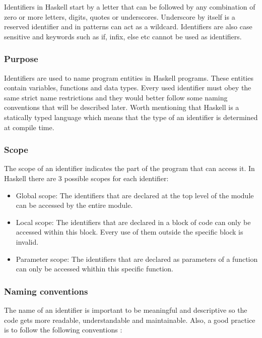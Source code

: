 \documentclass[a4paper, titlepage, twoside]{article}
\begin{document}
Identifiers in Haskell start by a letter that can be followed by any combination of zero or more letters, digits, quotes or underscores.  Underscore by itself is a reserved identifier and in patterns can act as a wildcard. Identifiers are also case sensitive and keywords such as if, infix, else etc cannot be used as identifiers.

\subsubsection{Purpose}
\label{sec:org1d34997}

Identifiers are used to name program entities in Haskell programs. These entities contain variables, functions and data types. Every used identifier must obey the same strict name restrictions and they would better follow some naming conventions that will be described later.  Worth mentioning that Haskell is a statically typed language which means that the type of an identifier is determined at compile time.

\subsubsection{Scope}
\label{sec:org1c0b7af}

The scope of an identifier indicates the part of the program that can access it. In Haskell there are 3 possible scopes for each identifier:

\begin{itemize}
\item Global scope: The identifiers that are declared at the top level of the module can be accessed by the entire module.

\item Local scope: The identifiers that are declared in a block of code can only be accessed within this block. Every use of them outside the specific block is invalid.

\item Parameter scope: The identifiers that are declared as parameters of a function can only be accessed whithin this specific function.
\end{itemize}

\subsubsection{Naming conventions}
\label{sec:org7b826f7}

The name of an identifier is important to be meaningful and descriptive so the code gets more readable, understandable and maintainable. Also, a good practice is to follow the following conventions \autocite{haskellwikiProgrammingGuidelinesHaskellWiki2022}:
\end{document}
